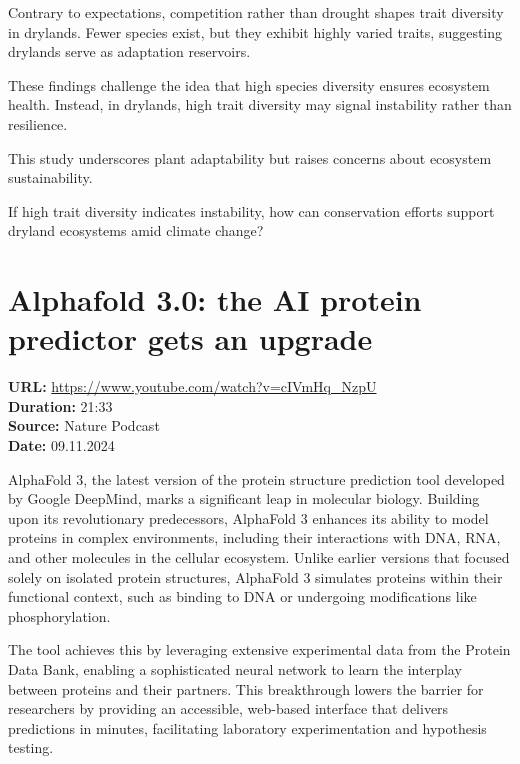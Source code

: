 \documentclass[12pt]{article}
\begin{document}
Contrary to expectations, competition rather than drought shapes trait diversity in drylands. Fewer species exist, but they exhibit highly varied traits, suggesting drylands serve as adaptation reservoirs.

These findings challenge the idea that high species diversity ensures ecosystem health. Instead, in drylands, high trait diversity may signal instability rather than resilience.

This study underscores plant adaptability but raises concerns about ecosystem sustainability.

\vspace{.5cm}
If high trait diversity indicates instability, how can conservation efforts support dryland ecosystems amid climate change?







\newpage

\section{Alphafold 3.0: the AI protein predictor gets an upgrade}
\textbf{URL:} \url{https://www.youtube.com/watch?v=cIVmHq_NzpU}\\
\textbf{Duration:} 21:33\\
\textbf{Source:} Nature Podcast\\
\textbf{Date:} 09.11.2024



AlphaFold 3, the latest version of the protein structure prediction tool developed by Google DeepMind, marks a significant leap in molecular biology. Building upon its revolutionary predecessors, AlphaFold 3 enhances its ability to model proteins in complex environments, including their interactions with DNA, RNA, and other molecules in the cellular ecosystem. Unlike earlier versions that focused solely on isolated protein structures, AlphaFold 3 simulates proteins within their functional context, such as binding to DNA or undergoing modifications like phosphorylation.

The tool achieves this by leveraging extensive experimental data from the Protein Data Bank, enabling a sophisticated neural network to learn the interplay between proteins and their partners. This breakthrough lowers the barrier for researchers by providing an accessible, web-based interface that delivers predictions in minutes, facilitating laboratory experimentation and hypothesis testing.
\end{document}
